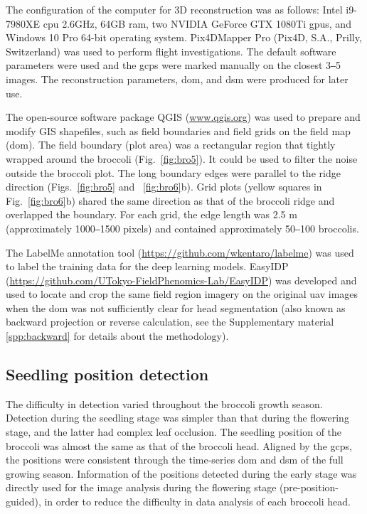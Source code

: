 The configuration of the computer for 3D reconstruction was as follows: Intel  i9-7980XE \gls{cpu} \@2.6GHz, 64GB \gls{ram}, two NVIDIA GeForce GTX 1080Ti \gls{gpu}s, and Windows 10 Pro 64-bit operating system. Pix4DMapper Pro (Pix4D, S.A., Prilly, Switzerland) was used to perform flight investigations. The default software parameters were used and the \gls{gcp}s were marked manually on the closest 3‒5 images. The reconstruction parameters, \gls{dom}, and \gls{dsm} were produced for later use. 

The open-source software package QGIS (\url{www.qgis.org}) was used to prepare and modify GIS shapefiles, such as field boundaries and field grids on the field map (\gls{dom}). The field boundary (plot area) was a rectangular region that tightly wrapped around the broccoli (Fig.~\ref{fig:bro5}). It could be used to filter the noise outside the broccoli plot. The long boundary edges were parallel to the ridge direction (Figs.~\ref{fig:bro5} and ~\ref{fig:bro6}b). Grid plots (yellow squares in Fig.~\ref{fig:bro6}b) shared the same direction as that of the broccoli ridge and overlapped the boundary. For each grid, the edge length was 2.5 m (approximately 1000‒1500 pixels) and contained approximately 50‒100 broccolis. 



The LabelMe annotation tool (\url{https://github.com/wkentaro/labelme}) was used to label the training data for the deep learning models. EasyIDP (\url{https://github.com/UTokyo-FieldPhenomics-Lab/EasyIDP}) was developed and used to locate and crop the same field region imagery on the original \gls{uav} images when the \gls{dom} was not sufficiently clear for head segmentation (also known as backward projection or reverse calculation, see the Supplementary material \ref{spp:backward} for details about the methodology).

\subsection{Seedling position detection} \label{sec:detect}

The difficulty in detection varied throughout the broccoli growth season. Detection during the seedling stage was simpler than that during the flowering stage, and the latter had complex leaf occlusion. The seedling position of the broccoli was almost the same as that of the broccoli head. Aligned by the \gls{gcp}s, the positions were consistent through the time-series \gls{dom} and \gls{dsm} of the full growing season. Information of the positions detected during the early stage was directly used for the image analysis during the flowering stage (pre-position-guided), in order to reduce the difficulty in data analysis of each broccoli head.

